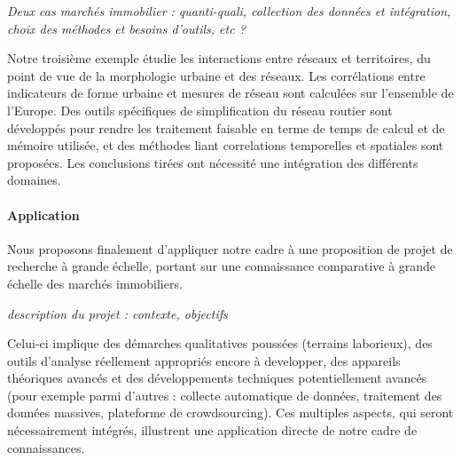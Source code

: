 \documentclass[11pt]{article}
\begin{document}
\textit{Deux cas marchés immobilier : quanti-quali, collection des données et intégration, choix des méthodes et besoins d'outils, etc ?}

Notre troisième exemple étudie les interactions entre réseaux et territoires, du point de vue de la morphologie urbaine et des réseaux. Les corrélations entre indicateurs de forme urbaine et mesures de réseau sont calculées sur l'ensemble de l'Europe. Des outils spécifiques de simplification du réseau routier sont développés pour rendre les traitement faisable en terme de temps de calcul et de mémoire utilisée, et des méthodes liant correlations temporelles et spatiales sont proposées. Les conclusions tirées ont nécessité une intégration des différents domaines.


\paragraph{Application}

Nous proposons finalement d'appliquer notre cadre à une proposition de projet de recherche à grande échelle, portant sur une connaissance comparative à grande échelle des marchés immobiliers. 

\textit{description du projet : contexte, objectifs}

Celui-ci implique des démarches qualitatives poussées (terrains laborieux), des outils d'analyse réellement appropriés encore à developper, des appareils théoriques avancés et des développements techniques potentiellement avancés (pour exemple parmi d'autres : collecte automatique de données, traitement des données massives, plateforme de crowdsourcing). Ces multiples aspects, qui seront nécessairement intégrés, illustrent une application directe de notre cadre de connaissances.














\end{document}
